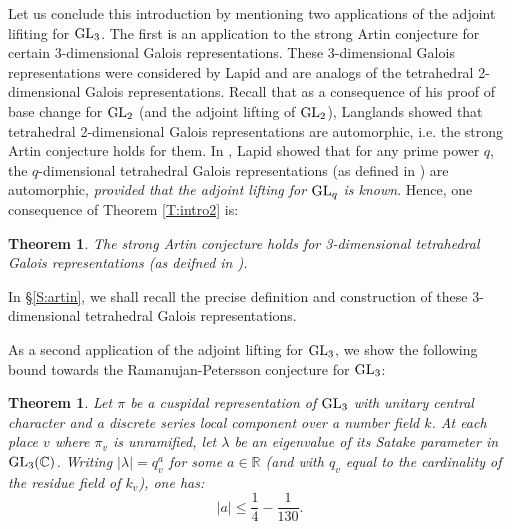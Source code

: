 \documentclass[11pt]{amsart}
\theoremstyle{plain}
\newtheorem{thm}[equation]{Theorem}
\numberwithin{equation}{section}
\newcommand{\R}{\mathbb R}
\newcommand{\C}{\mathbb C}
\def\GL{{\rm GL}}
\def\R{{\mathbb R}}
\def\C{{\bf C}}
\def\C{{\mathbb C}}
\begin{document}
Let us conclude this introduction by mentioning two applications of the adjoint lifiting for $\GL_3$. The first is an application to the strong Artin conjecture for certain 3-dimensional Galois representations. These 3-dimensional Galois representations were considered by Lapid \cite[\S 5]{L2} and are analogs of the tetrahedral 2-dimensional Galois representations. Recall that as a consequence of his proof of base change for $\GL_2$ (and the adjoint lifting of $\GL_2$), Langlands showed that  tetrahedral 2-dimensional Galois representations are automorphic, i.e. the strong Artin conjecture holds for them.   In \cite[Prop. 2]{L2}, Lapid showed that  for any prime power $q$, the $q$-dimensional tetrahedral Galois representations (as defined in \cite[\S 5]{L2}) are automorphic, {\em provided that the adjoint lifting  for $\GL_q$ is known}.
Hence, one consequence of Theorem \ref{T:intro2} is:
\vskip 5pt

\begin{thm} \label{T:artin1}
The strong Artin conjecture holds for   3-dimensional tetrahedral Galois representations (as deifned in \cite[\S 5]{L2}).
\end{thm} 
\noindent In \S \ref{S:artin}, we shall recall the precise definition and construction of these 3-dimensional tetrahedral Galois representations. 


\vskip 5pt


As a second application of the adjoint lifting for $\GL_3$, we show the following bound towards the Ramanujan-Petersson conjecture for $\GL_3$:
\vskip 5pt

\begin{thm} \label{T:Rama1}
Let $\pi$ be a cuspidal representation of $\GL_3$ with unitary central character and a discrete series local component over a number field $k$. At each place $v$ where $\pi_v$ is unramified, let $\lambda$ be an eigenvalue of its Satake parameter in $\GL_3(\C)$. Writing $|\lambda| = q_v^a$ for some $a \in \R$ (and with $q_v$ equal to the cardinality of the residue field of $k_v$), one has:
\[ |a| \leq  \frac{1}{4} - \frac{1}{130}. \]
\end{thm}
\end{document}
